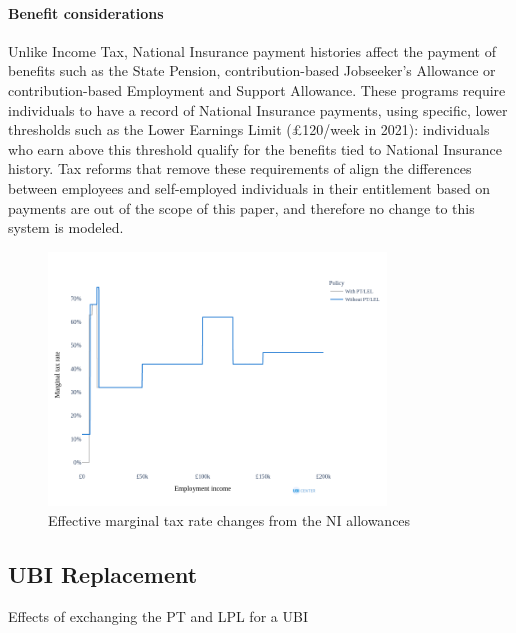 \documentclass{article}
\begin{document}
    \paragraph{Benefit considerations} Unlike Income Tax, National Insurance payment histories affect the payment of benefits such as the State Pension, contribution-based Jobseeker's Allowance or contribution-based Employment and Support Allowance. These programs require individuals to have a record of National Insurance payments, using specific, lower thresholds such as the Lower Earnings Limit (£120/week in 2021): individuals who earn above this threshold qualify for the benefits tied to National Insurance history. Tax reforms that remove these requirements of align the differences between employees and self-employed individuals in their entitlement based on payments are out of the scope of this paper, and therefore no change to this system is modeled.

    \begin{figure}
        \centering
        \includegraphics[width=0.8\textwidth]{images/fig_9.png}
        \caption{Effective marginal tax rate changes from the NI allowances}
        \label{fig:NI_mtr_effects}
    \end{figure}

    \subsection{UBI Replacement}

    \begin{table}
        \centering
        
        \caption{Effects of exchanging the PT and LPL for a UBI}
        \label{tab:NI_UBI_effects}
    \end{table}
\end{document}
